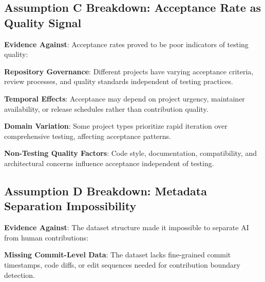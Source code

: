 \documentclass[conference]{IEEEtran}
\begin{document}
\subsection{Assumption C Breakdown: Acceptance Rate as Quality Signal}

\textbf{Evidence Against}: Acceptance rates proved to be poor indicators of testing quality:

\textbf{Repository Governance}: Different projects have varying acceptance criteria, review processes, and quality standards independent of testing practices.

\textbf{Temporal Effects}: Acceptance may depend on project urgency, maintainer availability, or release schedules rather than contribution quality.

\textbf{Domain Variation}: Some project types prioritize rapid iteration over comprehensive testing, affecting acceptance patterns.

\textbf{Non-Testing Quality Factors}: Code style, documentation, compatibility, and architectural concerns influence acceptance independent of testing.

\subsection{Assumption D Breakdown: Metadata Separation Impossibility}

\textbf{Evidence Against}: The dataset structure made it impossible to separate AI from human contributions:

\textbf{Missing Commit-Level Data}: The dataset lacks fine-grained commit timestamps, code diffs, or edit sequences needed for contribution boundary detection.
\end{document}
